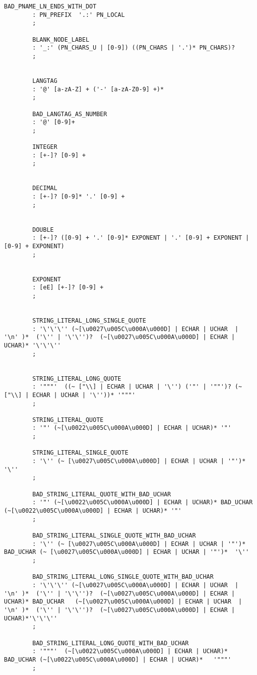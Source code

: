 \begin{appendices}
\begin{lstlisting}[breaklines,basicstyle=\ttfamily]
		BAD_PNAME_LN_ENDS_WITH_DOT	  
		: PN_PREFIX  '.:' PN_LOCAL 
		;
		
		BLANK_NODE_LABEL
		: '_:' (PN_CHARS_U | [0-9]) ((PN_CHARS | '.')* PN_CHARS)?
		;
		
		
		LANGTAG
		: '@' [a-zA-Z] + ('-' [a-zA-Z0-9] +)*
		;
		
		BAD_LANGTAG_AS_NUMBER
		: '@' [0-9]+
		;
		
		INTEGER
		: [+-]? [0-9] +
		;
		
		
		DECIMAL
		: [+-]? [0-9]* '.' [0-9] +
		;
		
		
		DOUBLE
		: [+-]? ([0-9] + '.' [0-9]* EXPONENT | '.' [0-9] + EXPONENT | [0-9] + EXPONENT)
		;
		
		
		EXPONENT
		: [eE] [+-]? [0-9] +
		;
		
		
		STRING_LITERAL_LONG_SINGLE_QUOTE
		: '\'\'\'' (~[\u0027\u005C\u000A\u000D] | ECHAR | UCHAR  | '\n' )*  ('\'' | '\'\'')?  (~[\u0027\u005C\u000A\u000D] | ECHAR | UCHAR)* '\'\'\''  
		;
		
		
		STRING_LITERAL_LONG_QUOTE
		: '"""'  ((~ ["\\] | ECHAR | UCHAR | '\'') ('"' | '""')? (~ ["\\] | ECHAR | UCHAR | '\''))* '"""'
		;
		
		STRING_LITERAL_QUOTE
		: '"' (~[\u0022\u005C\u000A\u000D] | ECHAR | UCHAR)* '"' 
		;
		
		STRING_LITERAL_SINGLE_QUOTE
		: '\'' (~ [\u0027\u005C\u000A\u000D] | ECHAR | UCHAR | '"')* '\''
		;
		
		BAD_STRING_LITERAL_QUOTE_WITH_BAD_UCHAR
		: '"' (~[\u0022\u005C\u000A\u000D] | ECHAR | UCHAR)* BAD_UCHAR (~[\u0022\u005C\u000A\u000D] | ECHAR | UCHAR)* '"' 
		;
		
		BAD_STRING_LITERAL_SINGLE_QUOTE_WITH_BAD_UCHAR
		: '\'' (~ [\u0027\u005C\u000A\u000D] | ECHAR | UCHAR | '"')*  BAD_UCHAR (~ [\u0027\u005C\u000A\u000D] | ECHAR | UCHAR | '"')*  '\''
		;
		
		BAD_STRING_LITERAL_LONG_SINGLE_QUOTE_WITH_BAD_UCHAR
		: '\'\'\'' (~[\u0027\u005C\u000A\u000D] | ECHAR | UCHAR  | '\n' )*  ('\'' | '\'\'')?  (~[\u0027\u005C\u000A\u000D] | ECHAR | UCHAR)* BAD_UCHAR   (~[\u0027\u005C\u000A\u000D] | ECHAR | UCHAR  | '\n' )*  ('\'' | '\'\'')?  (~[\u0027\u005C\u000A\u000D] | ECHAR | UCHAR)*'\'\'\''  
		;
		
		BAD_STRING_LITERAL_LONG_QUOTE_WITH_BAD_UCHAR
		: '"""'  (~[\u0022\u005C\u000A\u000D] | ECHAR | UCHAR)*   BAD_UCHAR (~[\u0022\u005C\u000A\u000D] | ECHAR | UCHAR)*   '"""'
		;
		

\end{lstlisting}
\end{appendices}
